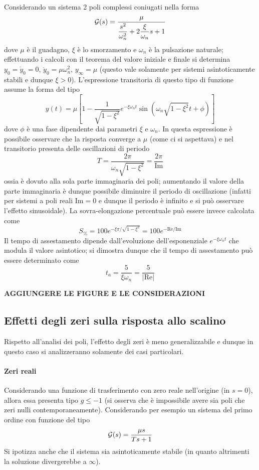 		\vspace{3mm}
		Considerando un sistema 2 poli complessi coniugati nella forma
		\[\mathcal G(s) = \frac{\mu}{\dfrac{s^2}{\omega_n^2} + 2 \dfrac{\xi}{\omega_n} s +  1}\]
		dove $\mu$ è il guadagno, $\xi$ è lo smorzamento e $\omega_n$ è la pulsazione naturale; effettuando i calcoli con il teorema del valore iniziale e finale si determina $y_0 = \dot y_0 = 0$, $\ddot y_0 = \mu \omega_n^2$, $y_\infty = \mu$ (questo vale solamente per sistemi asintoticamente stabili e dunque $\xi > 0$). L'espressione transitoria di questo tipo di funzione assume la forma del tipo
		\[ y(t) = \mu  \left[ 1 - \frac{1}{\sqrt{1-\xi^2}} e^{-\xi\omega_n t} \sin\left(\omega_n \sqrt{1-\xi^2} t + \phi\right)  \right] \]
		dove $\phi$ è una fase dipendente dai parametri $\xi$ e $\omega_n$. In questa espressione è possibile osservare che la risposta converge a $\mu$ (come ci si aspettava) e nel transitorio presenta delle oscillazioni di periodo
		\[ T = \frac{2\pi}{\omega_n \sqrt{1-\xi^2}} = \frac {2\pi}{\textrm{Im}} \]
		ossia è dovuto alla sola parte immaginaria dei poli; aumentando il valore della parte immaginaria è dunque possibile diminuire il periodo di oscillazione (infatti per sistemi a poli reali $\textrm{Im} = 0$ e dunque il periodo è infinito e si può osservare l'effetto sinusoidale). La sovra-elongazione percentuale può essere invece calcolata come
		\[ S_\% = 100 e^{-\xi \pi / \sqrt{1-\xi^2}} = 100 e^{-\textrm{Re}/\textrm{Im}}\]		
		Il tempo di assestamento dipende dall'evoluzione dell'esponenziale $e^{-\xi \omega_n t}$ che modula il valore asintotico; si dimostra dunque che il tempo di assestamento può essere determinato come
		\[ t_a = \frac{5}{\xi \omega_n} = \frac{5}{|\textrm{Re}|}\]
		
		\textbf{AGGIUNGERE LE FIGURE E LE CONSIDERAZIONI}
		
		
	\subsection{Effetti degli zeri sulla risposta allo scalino}
		Rispetto all'analisi dei poli, l'effetto degli zeri è meno generalizzabile e dunque in questo caso si analizzeranno solamente dei casi particolari.
		
		\paragraph{Zeri reali} Considerando una funzione di trasferimento con zero reale nell'origine (in $s=0$), allora essa presenta tipo $g\leq -1$ (si osserva che è impossibile avere sia poli che zeri nulli contemporaneamente). Considerando per esempio un sistema del primo ordine con funzione del tipo
		\[ \mathcal G(s) = \frac{\mu s}{Ts + 1}\]
		Si ipotizza anche che il sistema sia asintoticamente stabile (in quanto altrimenti la soluzione divergerebbe a $\infty$).
		
